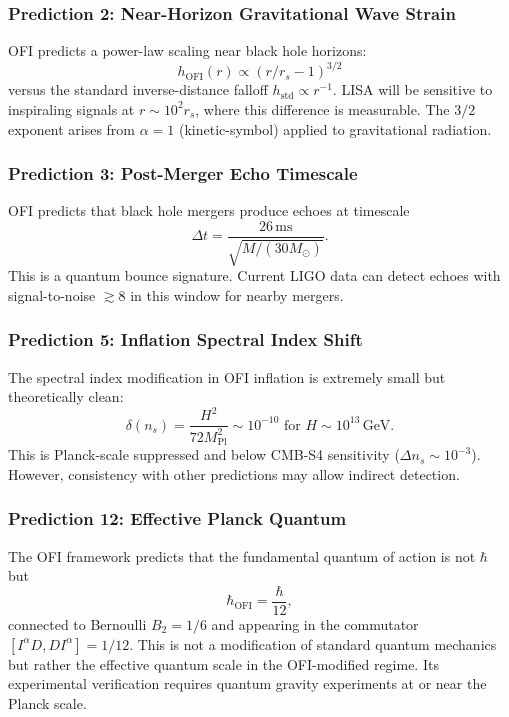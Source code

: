 \documentclass[12pt,a4paper]{article}
\theoremstyle{definition}
\newcommand{\Ialpha}{I^{\alpha}}
\newcommand{\OFI}{\text{OFI}}
\newcommand{\hbarOFI}{\hbar_{\OFI}}
\begin{document}
\subsubsection{Prediction 2: Near-Horizon Gravitational Wave Strain}

OFI predicts a power-law scaling near black hole horizons:
\begin{equation}
h_{\text{OFI}}(r) \propto (r/r_s - 1)^{3/2}
\end{equation}
versus the standard inverse-distance falloff $h_{\text{std}} \propto r^{-1}$. LISA will be sensitive to inspiraling signals at $r \sim 10^2 r_s$, where this difference is measurable. The $3/2$ exponent arises from $\alpha = 1$ (kinetic-symbol) applied to gravitational radiation.

\subsubsection{Prediction 3: Post-Merger Echo Timescale}

OFI predicts that black hole mergers produce echoes at timescale
\begin{equation}
\Delta t = \frac{26 \, \text{ms}}{\sqrt{M/(30 M_\odot)}}.
\end{equation}
This is a quantum bounce signature. Current LIGO data can detect echoes with signal-to-noise $\gtrsim 8$ in this window for nearby mergers.

\subsubsection{Prediction 5: Inflation Spectral Index Shift}

The spectral index modification in OFI inflation is extremely small but theoretically clean:
\begin{equation}
\delta(n_s) = \frac{H^2}{72 M_{\text{Pl}}^2} \sim 10^{-10} \text{ for } H \sim 10^{13} \, \text{GeV}.
\end{equation}
This is Planck-scale suppressed and below CMB-S4 sensitivity ($\Delta n_s \sim 10^{-3}$). However, consistency with other predictions may allow indirect detection.

\subsubsection{Prediction 12: Effective Planck Quantum}

The OFI framework predicts that the fundamental quantum of action is not $\hbar$ but
\begin{equation}
\hbarOFI = \frac{\hbar}{12},
\end{equation}
connected to Bernoulli $B_2 = 1/6$ and appearing in the commutator $[\Ialpha D, D\Ialpha] = 1/12$. This is not a modification of standard quantum mechanics but rather the effective quantum scale in the OFI-modified regime. Its experimental verification requires quantum gravity experiments at or near the Planck scale.
\end{document}
